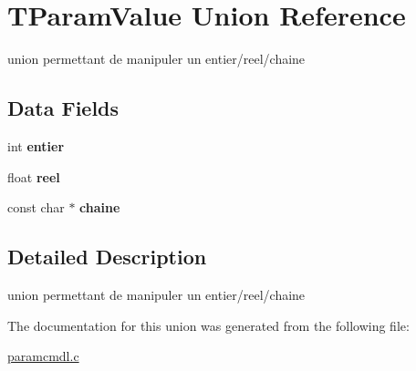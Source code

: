 \hypertarget{unionTParamValue}{}\section{T\+Param\+Value Union Reference}
\label{unionTParamValue}


union permettant de manipuler un entier/reel/chaine  


\subsection*{Data Fields}
\begin{DoxyCompactItemize}
\item 
int {\bfseries entier}\hypertarget{unionTParamValue_a85a2847d254115d744ac7d55391dc1ea}{}\label{unionTParamValue_a85a2847d254115d744ac7d55391dc1ea}

\item 
float {\bfseries reel}\hypertarget{unionTParamValue_a6c6e99a421de592ad46cf47aab9cef58}{}\label{unionTParamValue_a6c6e99a421de592ad46cf47aab9cef58}

\item 
const char $\ast$ {\bfseries chaine}\hypertarget{unionTParamValue_a3e12f31017e3dd1bb79801330f767a22}{}\label{unionTParamValue_a3e12f31017e3dd1bb79801330f767a22}

\end{DoxyCompactItemize}


\subsection{Detailed Description}
union permettant de manipuler un entier/reel/chaine 

The documentation for this union was generated from the following file\+:\begin{DoxyCompactItemize}
\item 
\hyperlink{paramcmdl_8c}{paramcmdl.\+c}\end{DoxyCompactItemize}
